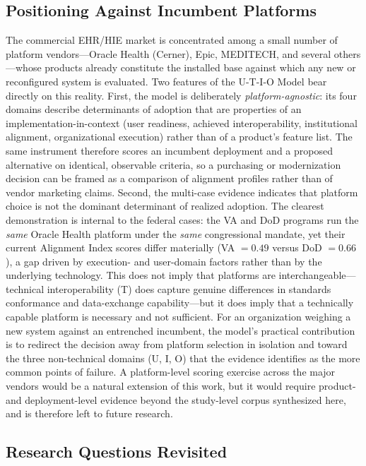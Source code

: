 \subsection{Positioning Against Incumbent Platforms}

The commercial EHR/HIE market is concentrated among a small number of platform vendors—Oracle Health (Cerner), Epic, MEDITECH, and several others—whose products already constitute the installed base against which any new or reconfigured system is evaluated. Two features of the U-T-I-O Model bear directly on this reality. First, the model is deliberately \textit{platform-agnostic}: its four domains describe determinants of adoption that are properties of an implementation-in-context (user readiness, achieved interoperability, institutional alignment, organizational execution) rather than of a product's feature list. The same instrument therefore scores an incumbent deployment and a proposed alternative on identical, observable criteria, so a purchasing or modernization decision can be framed as a comparison of alignment profiles rather than of vendor marketing claims. Second, the multi-case evidence indicates that platform choice is not the dominant determinant of realized adoption. The clearest demonstration is internal to the federal cases: the VA and DoD programs run the \textit{same} Oracle Health platform under the \textit{same} congressional mandate, yet their current Alignment Index scores differ materially (VA $=0.49$ versus DoD $=0.66$), a gap driven by execution- and user-domain factors rather than by the underlying technology. This does not imply that platforms are interchangeable—technical interoperability (T) does capture genuine differences in standards conformance and data-exchange capability—but it does imply that a technically capable platform is necessary and not sufficient. For an organization weighing a new system against an entrenched incumbent, the model's practical contribution is to redirect the decision away from platform selection in isolation and toward the three non-technical domains (U, I, O) that the evidence identifies as the more common points of failure. A platform-level scoring exercise across the major vendors would be a natural extension of this work, but it would require product- and deployment-level evidence beyond the study-level corpus synthesized here, and is therefore left to future research.


\subsection{Research Questions Revisited}

